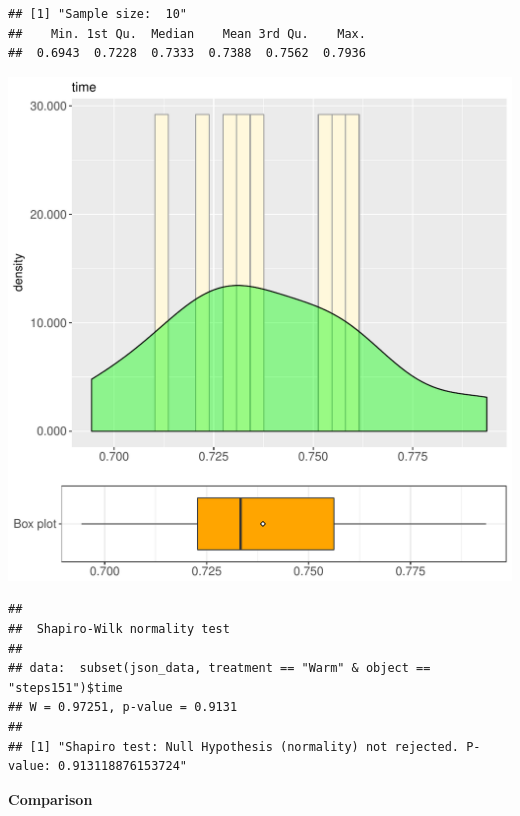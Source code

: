 \documentclass{article}\usepackage[]{graphicx}\usepackage[]{color}
\makeatletter
\def\maxwidth{ %
  \ifdim\Gin@nat@width>\linewidth
    \linewidth
  \else
    \Gin@nat@width
  \fi
}
\newenvironment{kframe}{%
 \def\at@end@of@kframe{}%
 \ifinner\ifhmode%
  \def\at@end@of@kframe{\end{minipage}}%
  \begin{minipage}{\columnwidth}%
 \fi\fi%
 \def\FrameCommand##1{\hskip\@totalleftmargin \hskip-\fboxsep
 \colorbox{shadecolor}{##1}\hskip-\fboxsep
     \hskip-\linewidth \hskip-\@totalleftmargin \hskip\columnwidth}%
 \MakeFramed {\advance\hsize-\width
   \@totalleftmargin\z@ \linewidth\hsize
   \@setminipage}}%
 {\par\unskip\endMakeFramed%
 \at@end@of@kframe}
\newenvironment{knitrout}{}{} %
\makeatother
\begin{document}
\begin{knitrout}
\color{fgcolor}\begin{kframe}
\begin{verbatim}
## [1] "Sample size:  10"
##    Min. 1st Qu.  Median    Mean 3rd Qu.    Max. 
##  0.6943  0.7228  0.7333  0.7388  0.7562  0.7936
\end{verbatim}
\end{kframe}
\includegraphics[width=\maxwidth]{figure/RH1_Warm_steps151-1} 
\begin{kframe}\begin{verbatim}
## 
## 	Shapiro-Wilk normality test
## 
## data:  subset(json_data, treatment == "Warm" & object == "steps151")$time
## W = 0.97251, p-value = 0.9131
## 
## [1] "Shapiro test: Null Hypothesis (normality) not rejected. P-value: 0.913118876153724"
\end{verbatim}
\end{kframe}
\end{knitrout}
  
 \textbf{Comparison}
  
\end{document}
